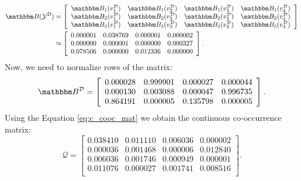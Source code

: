 \documentclass[shortabstract]{iithesis}
\begin{document}
\begin{equation*}
\begin{aligned}
    \mathbbm B(\mathcal Y^{\mathcal D}) & = \left[\begin{array}{cccc}
    \mathbbm B_1(v^{\mathcal D}_1) & \mathbbm B_1(v^{\mathcal D}_2) & \mathbbm B_1(v^{\mathcal D}_3) & \mathbbm B_1(v^{\mathcal D}_4) \\
    \mathbbm B_2(v^{\mathcal D}_1) & \mathbbm B_2(v^{\mathcal D}_2) & \mathbbm B_2(v^{\mathcal D}_3) & \mathbbm B_2(v^{\mathcal D}_4) \\
    \mathbbm B_3(v^{\mathcal D}_1) & \mathbbm B_3(v^{\mathcal D}_2) & \mathbbm B_3(v^{\mathcal D}_3) & \mathbbm B_3(v^{\mathcal D}_4) \\
    \end{array} \right] \\
    & \approx \left[\begin{array}{cccc}
    0.000001 & 0.038769 & 0.000001 & 0.000002 \\
    0.000000 & 0.000001 & 0.000000 & 0.000327 \\
    0.078506 & 0.000000 & 0.012336 & 0.000000 \\
    \end{array} \right].
\end{aligned}
\end{equation*}
Now, we need to normalize rows of the matrix:
\begin{equation*}
    \mathbbm B^{\mathcal D} = 
    \left[\begin{array}{cccc}
    0.000028 & 0.999901 & 0.000027 & 0.000044 \\
    0.000130 & 0.003088 & 0.000047 & 0.996735 \\
    0.864191 & 0.000005 & 0.135798 & 0.000005 \\
    \end{array} \right].
\end{equation*}
Using the Equation \ref{eq:c_cooc_mat} we obtain the continuous co-occurrence matrix:
\begin{equation*}
    \mathcal Q = \left[\begin{array}{cccc}
    0.038410 & 0.011110 & 0.006036 & 0.000002 \\
    0.000036 & 0.001468 & 0.000006 & 0.012840 \\
    0.006036 & 0.001746 & 0.000949 & 0.000001 \\
    0.011076 & 0.000027 & 0.001741 & 0.008516 \\
    \end{array} \right].
\end{equation*}
\end{document}

